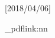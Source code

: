 %
%
%
%
%
%
%
%
%

\usepackage{pdfbase,ocgbase}[2018/04/06]
\usepackage{xparse}
\usepackage{calc,linegoal}
\usepackage{xcolor}

\makeatletter


\let\Hy@setpdfborderOrig\Hy@setpdfborder
\def\Hy@setpdfborder{\ocgbase@insert@oc\Hy@setpdfborderOrig}%


\ExplSyntaxOn
\let\XC@pdfLink\pbs_pdflink:nn
\ExplSyntaxOff

\newsavebox{\XC@tipText}

\newlength{\XC@hGoal}
\newlength{\XC@hShift}
\newlength{\XC@hOffset} \setlength\XC@hOffset{-0.1em}
\newlength{\XC@vOffset} \setlength\XC@vOffset{0.2ex}


